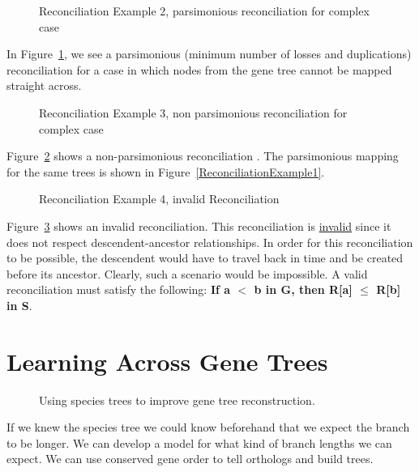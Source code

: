 \begin{figure}[H]
  \centering
  \caption{Reconciliation Example 2, parsimonious reconciliation for complex case} 
  \label{ReconciliationExample2}
\end{figure}
\noindent In Figure~\ref{ReconciliationExample2}, we see a parsimonious (minimum number of losses and duplications) reconciliation for a case in which nodes from the gene tree cannot be mapped straight across.  

\begin{figure}[H]
  \centering
  \caption{Reconciliation Example 3, non parsimonious reconciliation for complex case} 
  \label{ReconciliationExample3}
\end{figure}
\noindent Figure~\ref{ReconciliationExample3} shows a non-parsimonious reconciliation . The parsimonious mapping for the same trees is shown in Figure~\ref{ReconciliationExample1}.

\begin{figure}[H]
  \centering
  \caption{Reconciliation Example 4, invalid Reconciliation} 
  \label{ReconciliationExample4}
\end{figure}
\noindent Figure~\ref{ReconciliationExample4}  shows an invalid reconciliation. This reconciliation is \underline{invalid} since it does not respect descendent-ancestor relationships. In order for this reconciliation to be possible, the descendent would have to travel back in time and be created before its ancestor. Clearly, such a scenario would be impossible. A valid reconciliation must satisfy the following: {\bf If a $<$ b in G, then R[a] $\le$ R[b] in S}.

\section{Learning Across Gene Trees}

\begin{figure}[ht!]
  \centering
  \caption{Using species trees to improve gene tree reconstruction.} 
  \label{Fig10_LearningAcrossGeneTrees}
\end{figure}

If we knew the species tree we could know beforehand that we expect
the branch to be longer. We can develop a model for what kind of
branch lengths we can expect. We can use conserved gene order to tell
orthologs and build trees.

